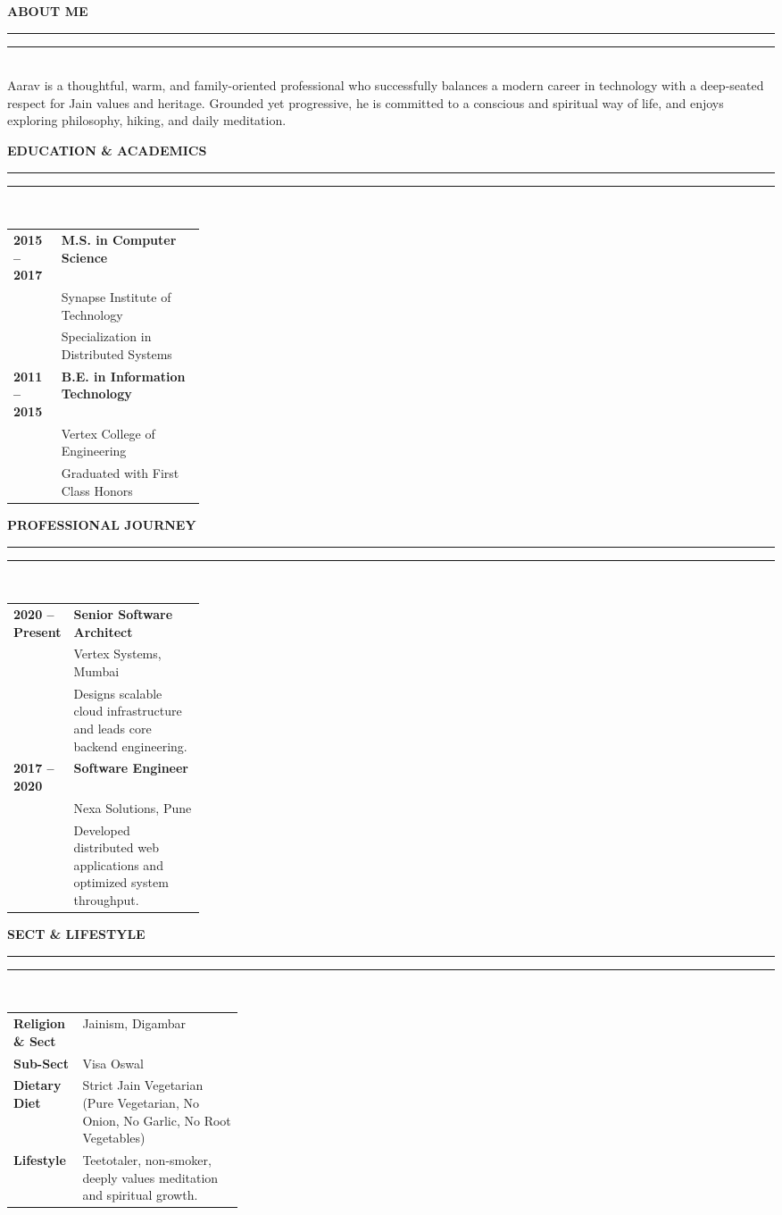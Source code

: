 \documentclass[10pt,letterpaper]{article}
\newcommand{\sectiontitle}[1]{%
  \vspace{0.25cm}%
  {\noindent\color{primary}\fontsize{10.5}{12}\selectfont\sffamily\bfseries\MakeUppercase{#1}} \\[0.15em]
  {\noindent\color{primary}\rule{0.2\linewidth}{1.2pt}}\hfill{\color{lightgray}\rule{0.78\linewidth}{0.4pt}} \\[-0.25em]%
}
\begin{document}
\begin{minipage}[t]{0.64\textwidth}
  \sectiontitle{About Me}
  \fontsize{9.5}{13.5}\selectfont\color{charcoal}%
  Aarav is a thoughtful, warm, and family-oriented professional who successfully balances a modern career in technology with a deep-seated respect for Jain values and heritage. Grounded yet progressive, he is committed to a conscious and spiritual way of life, and enjoys exploring philosophy, hiking, and daily meditation.
  
  \sectiontitle{Education \& Academics}
  \fontsize{9.5}{12.5}\selectfont\color{charcoal}%
  \begin{tabularx}{\linewidth}{@{}p{0.25\linewidth} X@{}}
    \textbf{2015 -- 2017} & \textbf{M.S. in Computer Science} \\
    & Synapse Institute of Technology \\
    & Specialization in Distributed Systems \\[0.3em]
    \textbf{2011 -- 2015} & \textbf{B.E. in Information Technology} \\
    & Vertex College of Engineering \\
    & Graduated with First Class Honors \\
  \end{tabularx}
  
  \sectiontitle{Professional Journey}
  \fontsize{9.5}{12.5}\selectfont\color{charcoal}%
  \begin{tabularx}{\linewidth}{@{}p{0.25\linewidth} X@{}}
    \textbf{2020 -- Present} & \textbf{Senior Software Architect} \\
    & Vertex Systems, Mumbai \\
    & Designs scalable cloud infrastructure and leads core backend engineering. \\[0.3em]
    \textbf{2017 -- 2020} & \textbf{Software Engineer} \\
    & Nexa Solutions, Pune \\
    & Developed distributed web applications and optimized system throughput. \\
  \end{tabularx}
  
  \sectiontitle{Sect \& Lifestyle}
  \fontsize{9.5}{12.5}\selectfont\color{charcoal}%
  \begin{tabularx}{\linewidth}{@{}p{0.3\linewidth} X@{}}
    \textbf{Religion \& Sect} & Jainism, Digambar \\
    \textbf{Sub-Sect} & Visa Oswal \\
    \textbf{Dietary Diet} & Strict Jain Vegetarian (Pure Vegetarian, No Onion, No Garlic, No Root Vegetables) \\
    \textbf{Lifestyle} & Teetotaler, non-smoker, deeply values meditation and spiritual growth. \\
  \end{tabularx}
\end{minipage}
\end{document}
